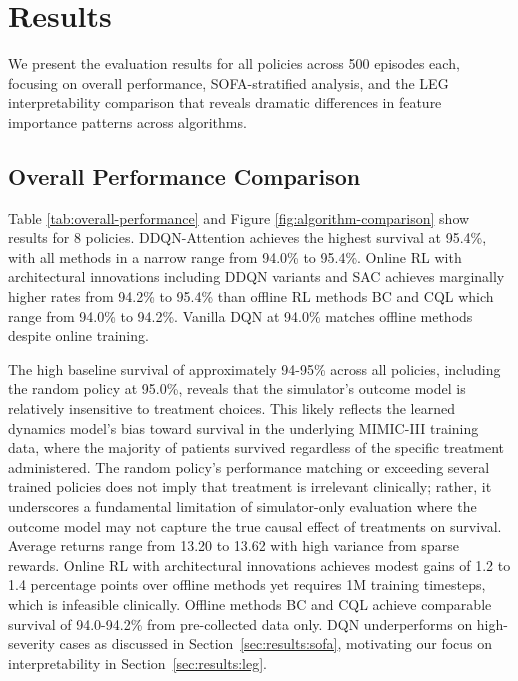 
\section{Results}\label{sec:results}

We present the evaluation results for all policies across 500 episodes each, focusing on overall performance, SOFA-stratified analysis, and the LEG interpretability comparison that reveals dramatic differences in feature importance patterns across algorithms.

\subsection{Overall Performance Comparison}\label{sec:results:overall}

Table \ref{tab:overall-performance} and Figure \ref{fig:algorithm-comparison} show results for 8 policies. DDQN-Attention achieves the highest survival at 95.4\%, with all methods in a narrow range from 94.0\% to 95.4\%. Online RL with architectural innovations including DDQN variants and SAC achieves marginally higher rates from 94.2\% to 95.4\% than offline RL methods BC and CQL which range from 94.0\% to 94.2\%. Vanilla DQN at 94.0\% matches offline methods despite online training.

The high baseline survival of approximately 94-95\% across all policies, including the random policy at 95.0\%, reveals that the simulator's outcome model is relatively insensitive to treatment choices. This likely reflects the learned dynamics model's bias toward survival in the underlying MIMIC-III training data, where the majority of patients survived regardless of the specific treatment administered. The random policy's performance matching or exceeding several trained policies does not imply that treatment is irrelevant clinically; rather, it underscores a fundamental limitation of simulator-only evaluation where the outcome model may not capture the true causal effect of treatments on survival. Average returns range from 13.20 to 13.62 with high variance from sparse rewards. Online RL with architectural innovations achieves modest gains of 1.2 to 1.4 percentage points over offline methods yet requires 1M training timesteps, which is infeasible clinically. Offline methods BC and CQL achieve comparable survival of 94.0-94.2\% from pre-collected data only. DQN underperforms on high-severity cases as discussed in Section~\ref{sec:results:sofa}, motivating our focus on interpretability in Section~\ref{sec:results:leg}.

